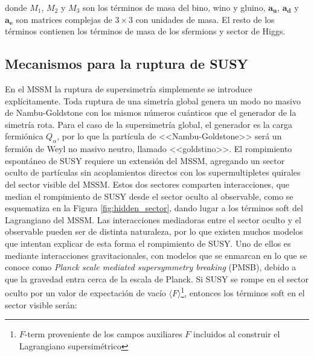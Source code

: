 \noindent
donde $M_1$, $M_2$ y $M_3$ son los términos de masa del bino, wino y gluino, $\textbf{a}_\textbf{u}$, $\textbf{a}_\textbf{d}$ y $\textbf{a}_\textbf{e}$ son matrices complejas de $3\times3$ con unidades de masa.
El resto de los términos contienen los términos de masa de los sfermions y sector de Higgs.



\subsection{Mecanismos para la ruptura de SUSY}


En el MSSM la ruptura de supersimetría simplemente se introduce explícitamente. Toda ruptura de una simetría global genera un modo no masivo de Nambu-Goldstone con los mismos números cuánticos que el generador de la simetría rota.
Para el caso de la supersimetría global, el generador es la carga fermiónica $Q_{\alpha}$,
por lo que la partícula de <<Nambu-Goldstone>> será un fermión de Weyl no masivo
neutro, llamado <<goldstino>>.
El rompimiento espontáneo de SUSY requiere un extensión del MSSM, agregando un sector oculto de partículas sin acoplamientos directos con los supermultipletes quirales del sector visible del
MSSM. Estos dos sectores comparten interacciones, que median el rompimiento de
SUSY desde el sector oculto al observable, como se esquematiza en la Figura \ref{fig:hidden_sector}, dando lugar a los términos soft del Lagrangiano del MSSM.
Las interacciones mediadoras entre el sector oculto y el observable pueden ser
de distinta naturaleza, por lo que existen muchos modelos que intentan explicar de
esta forma el rompimiento de SUSY. Uno de ellos es mediante interacciones gravitacionales, con modelos que se enmarcan en lo que se conoce como \textit{Planck scale mediated supersymmetry breaking} (PMSB), debido a que la gravedad entra cerca de la escala de Planck. Si SUSY se rompe en el sector oculto por un valor de expectación de vacío $\langle F \rangle$\footnote{$F$-term proveniente de los campos auxiliares $F$ incluidos al construir el Lagrangiano supersimétrico}, entonces los términos soft en el sector visible serán:

